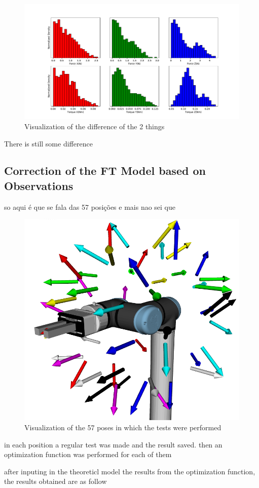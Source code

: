 \begin{figure}[h]
    \centering
    \includegraphics[width=\linewidth]{figs/chp3/ft_sensor_theory_hist.pdf}
    \caption{Visualization of the difference of the 2 things}
    \label{fig:ft_sensor_theory_hist}
\end{figure}

\par There is still some difference


\subsection{Correction of the FT Model based on Observations}

\par so aqui é que se fala das 57 posições e mais nao sei que

\begin{figure}[h]
    \centering
    \includegraphics[width=0.35\linewidth]{figs/chp3/globe_57.png}
    \caption{Visualization of the 57 poses in which the tests were performed}
    \label{fig:57_poses}
\end{figure}

\par in each position a regular test was made and the result saved. then an optimization function was performed for each of them 

\par after inputing in the theoreticl model the results from the optimization function, the results obtained are as follow

